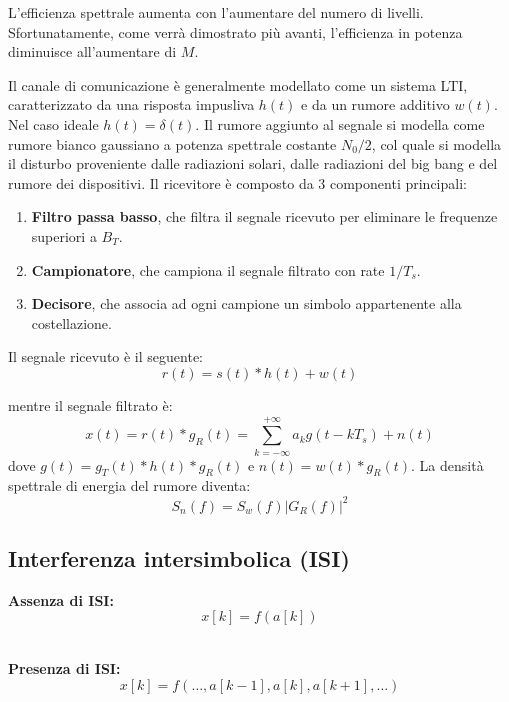 L'efficienza spettrale aumenta con l'aumentare del numero di livelli. Sfortunatamente, come verrà dimostrato più avanti, l'efficienza in potenza diminuisce all'aumentare di \( M \).

\begin{center}
    
\end{center}


Il canale di comunicazione è generalmente modellato come un sistema LTI, caratterizzato da una risposta impusliva $h(t)$ e da un rumore additivo $w(t)$.
Nel caso ideale $h(t) = \delta (t)$.
Il rumore aggiunto al segnale si modella come rumore bianco gaussiano a potenza spettrale costante $N_0/2$, col quale si modella il disturbo proveniente dalle radiazioni solari, dalle radiazioni del big bang e del rumore dei dispositivi.
Il ricevitore è composto da 3 componenti principali:
\begin{enumerate}
    \item \textbf{Filtro passa basso}, che filtra il segnale ricevuto per eliminare le frequenze superiori a $B_T$.
    \item \textbf{Campionatore}, che campiona il segnale filtrato con rate $1/T_s$.
    \item \textbf{Decisore}, che associa ad ogni campione un simbolo appartenente alla costellazione.
\end{enumerate}
Il segnale ricevuto è il seguente:
\[
    r(t) = s(t) \ast h(t) + w(t)
\]

mentre il segnale filtrato è:
\[
    x(t) = r(t) \ast g_R(t) = \sum_{k=-\infty}^{+\infty} a_k g(t - kT_s) + n(t)
\]
dove $g(t) = g_T(t) \ast h(t) \ast g_R(t)$ e $n(t) = w(t) \ast g_R(t)$. La densità spettrale di energia del rumore diventa:
\[
    S_n(f) = S_w(f) |G_R(f)|^2
\]


\subsection*{Interferenza intersimbolica (ISI)}
\noindent
\begin{minipage}{.5\textwidth}
    \centering
    \textbf{Assenza di ISI:}
    \[
        x[k] = f(a[k])
    \]
    \\
\end{minipage}%
\begin{minipage}{.5\textwidth}
    \centering
    \textbf{Presenza di ISI:}
    \[
        x[k] = f(\dots, a[k-1], a[k], a[k+1], \dots)
    \]
    \\
\end{minipage}



